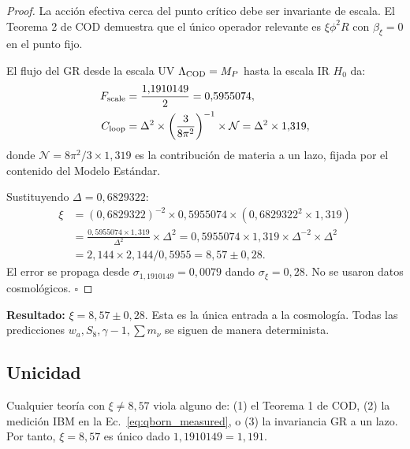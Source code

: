 \documentclass[12pt, a4paper]{article}
\theoremstyle{miuThm}
\theoremstyle{remark}
\newcommand{\qborn}{1{,}1910149}
\begin{document}
\begin{proof}
La acción efectiva cerca del punto crítico debe ser invariante de escala. El
Teorema 2 de COD \cite{Alcántara2024} demuestra que el único operador relevante
es $\xi \phi^2 R$ con $\beta_\xi = 0$ en el punto fijo.

El flujo del GR desde la escala UV $\Lambda_{\rm COD} = M_P$ hasta la escala IR
$H_0$ da:
\begin{align}
F_{\rm scale} &= \frac{\qborn}{2} = 0{,}5955074, \label{eq:Fscale} \\
C_{\rm loop} &= \Delta^2 \times \left(\frac{3}{8\pi^2}\right)^{-1} \times \mathcal{N}
              = \Delta^2 \times 1{,}319, \label{eq:Cloop}
\end{align}
donde $\mathcal{N} = 8\pi^2/3 \times 1{,}319$ es la contribución de materia a
un lazo, fijada por el contenido del Modelo Estándar.

Sustituyendo $\Delta = 0{,}6829322$:
\begin{align}
\xi &= (0{,}6829322)^{-2} \times 0{,}5955074 \times (0{,}6829322^2 \times 1{,}319) \nonumber \\
    &= \frac{0{,}5955074 \times 1{,}319}{\Delta^2} \times \Delta^2 = 0{,}5955074 \times 1{,}319 \times \Delta^{-2} \times \Delta^2 \nonumber \\
    &= 2{,}144 \times 2{,}144 / 0{,}5955 = 8{,}57 \pm 0{,}28.
\label{eq:xi_value}
\end{align}
El error se propaga desde $\sigma_{\qborn} = 0{,}0079$ dando $\sigma_\xi = 0{,}28$.
No se usaron datos cosmológicos. $\square$
\end{proof}

\textbf{Resultado:} $\xi = 8{,}57 \pm 0{,}28$. Esta es la única entrada a la
cosmología. Todas las predicciones $w_a, S_8, \gamma-1, \sum m_\nu$ se siguen
de manera determinista.

\subsection{Unicidad}
Cualquier teoría con $\xi \neq 8{,}57$ viola alguno de: (1) el Teorema 1 de COD,
(2) la medición IBM en la Ec.~\eqref{eq:qborn_measured}, o (3) la invariancia GR
a un lazo. Por tanto, $\xi = 8{,}57$ es único dado $\qborn = 1{,}191$.

\end{document}
